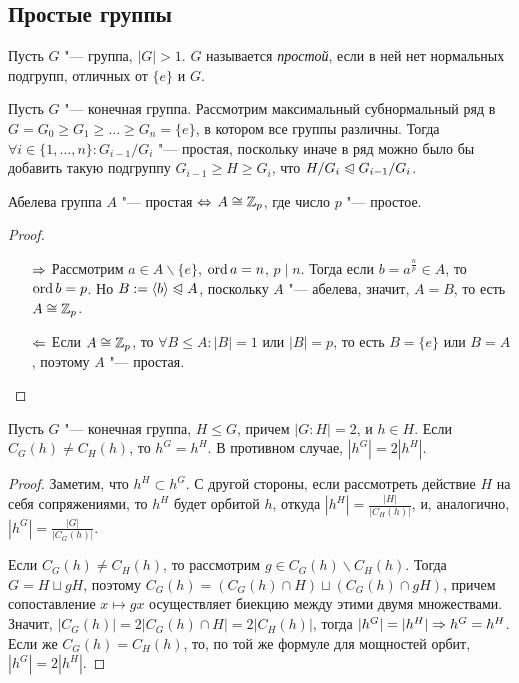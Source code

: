 \subsection{Простые группы}

\begin{definition}
	Пусть $G$ "--- группа, $|G| > 1$. $G$ называется \textit{простой}, если в ней нет нормальных подгрупп, отличных от $\{e\}$ и $G$.
\end{definition}

\begin{note}
	Пусть $G$ "--- конечная группа. Рассмотрим максимальный субнормальный ряд в $G = G_0 \ge G_1 \ge \dots \ge G_n = \{e\}$, в котором все группы различны. Тогда $\forall i \in \{1, \dotsc, n\}: G_{i-1}/G_i$ "--- простая, поскольку иначе в ряд можно было бы добавить такую подгруппу $G_{i-1} \ge H \ge G_i$, что $H/ G_i \trianglelefteqslant G_{i-1} / G_i$.
\end{note}

\begin{proposition}
	Абелева группа $A$ "--- простая $\Leftrightarrow$ $A \cong \mathbb{Z}_p$, где число $p$ "--- простое.
\end{proposition}

\begin{proof}~
	\begin{itemize}
		\item[$\Rightarrow$] Рассмотрим $a \in A \backslash \{e\}$, $\operatorname{ord}{a} = n$, $p\mid n$. Тогда если $b = a^{\frac np} \in A$, то $\operatorname{ord}{b} = p$. Но $B := \langle b \rangle \trianglelefteqslant A$, поскольку $A$ "--- абелева, значит, $A = B$, то есть $A \cong \mathbb{Z}_p$.
		\item[$\Leftarrow$] Если $A \cong \mathbb{Z}_p$, то $\forall B \le A: |B| = 1$ или $|B| = p$, то есть $B = \{e\}$ или $B = A$, поэтому $A$ "--- простая.
	\end{itemize}
\end{proof}

\begin{proposition}
	Пусть $G$ "--- конечная группа, $H \le G$, причем $|G : H| = 2$, и $h \in H$. Если $C_G(h) \ne C_H(h)$, то $h^G = h^H$. В противном случае, $|h^G| = 2|h^H|$.
\end{proposition}

\begin{proof}
	Заметим, что $h^H \subset h^G$. С другой стороны, если рассмотреть действие $H$ на себя сопряжениями, то $h^H$ будет орбитой $h$, откуда $|h^H| = \frac{|H|}{|C_H(h)|}$, и, аналогично, $|h^G| = \frac{|G|}{|C_G(h)|}$.
	
	Если $C_G(h) \ne C_H(h)$, то рассмотрим $g \in C_G(h) \backslash C_H(h)$. Тогда $G = H \sqcup gH$, поэтому $C_G(h) = (C_G(h) \cap H) \sqcup (C_G(h) \cap gH)$, причем сопоставление $x \mapsto gx$ осуществляет биекцию между этими двумя множествами. Значит, $|C_G(h)| = 2|C_G(h) \cap H|= 2|C_H(h)|$, тогда $|h^G| \hm= |h^H| \ra h^G \hm= h^H$. Если же $C_G(h) = C_H(h)$, то, по той же формуле для мощностей орбит, $|h^G| = 2|h^H|$.
\end{proof}

